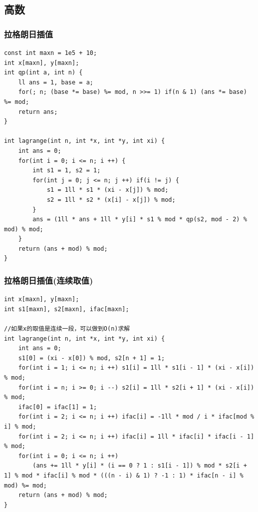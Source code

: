 \documentclass[twoside]{article}
\begin{document}
\subsection{高数}
\subsubsection{拉格朗日插值}
\begin{lstlisting}
const int maxn = 1e5 + 10;
int x[maxn], y[maxn];
int qp(int a, int n) {
	ll ans = 1, base = a;
	for(; n; (base *= base) %= mod, n >>= 1) if(n & 1) (ans *= base) %= mod;
	return ans;
}

int lagrange(int n, int *x, int *y, int xi) {
	int ans = 0;
	for(int i = 0; i <= n; i ++) {
		int s1 = 1, s2 = 1;
		for(int j = 0; j <= n; j ++) if(i != j) {
			s1 = 1ll * s1 * (xi - x[j]) % mod;
			s2 = 1ll * s2 * (x[i] - x[j]) % mod;
		}
		ans = (1ll * ans + 1ll * y[i] * s1 % mod * qp(s2, mod - 2) % mod) % mod;
	}
	return (ans + mod) % mod;
}\end{lstlisting}
\subsubsection{拉格朗日插值(连续取值)}
\begin{lstlisting}
int x[maxn], y[maxn];
int s1[maxn], s2[maxn], ifac[maxn];

//如果x的取值是连续一段，可以做到O(n)求解
int lagrange(int n, int *x, int *y, int xi) {
	int ans = 0;
	s1[0] = (xi - x[0]) % mod, s2[n + 1] = 1;
	for(int i = 1; i <= n; i ++) s1[i] = 1ll * s1[i - 1] * (xi - x[i]) % mod;
	for(int i = n; i >= 0; i --) s2[i] = 1ll * s2[i + 1] * (xi - x[i]) % mod;
	ifac[0] = ifac[1] = 1;
	for(int i = 2; i <= n; i ++) ifac[i] = -1ll * mod / i * ifac[mod % i] % mod;
	for(int i = 2; i <= n; i ++) ifac[i] = 1ll * ifac[i] * ifac[i - 1] % mod;
	for(int i = 0; i <= n; i ++)
		(ans += 1ll * y[i] * (i == 0 ? 1 : s1[i - 1]) % mod * s2[i + 1] % mod * ifac[i] % mod * (((n - i) & 1) ? -1 : 1) * ifac[n - i] % mod) %= mod;
	return (ans + mod) % mod;
}\end{lstlisting}
\end{document}
